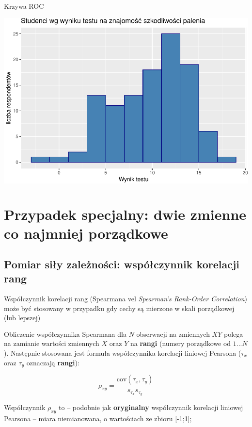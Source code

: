 \documentclass[
  openany]{book}
\begin{document}
\begin{example}
Krzywa ROC

\includegraphics{_main_files/figure-latex/unnamed-chunk-79-1.pdf}
\end{example}

\hypertarget{przypadek-specjalny-dwie-zmienne-co-najmniej-porzux105dkowe}{%
\section{Przypadek specjalny: dwie zmienne co najmniej porządkowe}\label{przypadek-specjalny-dwie-zmienne-co-najmniej-porzux105dkowe}}

\hypertarget{pomiar-siux142y-zaleux17cnoux15bci-wspuxf3ux142czynnik-korelacji-rang}{%
\subsection{Pomiar siły zależności: współczynnik korelacji rang}\label{pomiar-siux142y-zaleux17cnoux15bci-wspuxf3ux142czynnik-korelacji-rang}}

Współczynnik korelacji rang (Spearmana vel \emph{Spearman's Rank-Order Correlation})
może być stosowany
w przypadku gdy cechy są mierzone w skali porządkowej (lub lepszej)

Obliczenie współczynnika Spearmana dla \(N\) obserwacji na zmiennych \(XY\)
polega na zamianie wartości
zmiennych \(X\) oraz \(Y\) na \textbf{rangi} (numery porządkowe od \(1...N\)).
Następnie stosowana jest formuła współczynnika korelacji
liniowej Pearsona (\(\tau_x\) oraz \(\tau_y\) oznaczają \textbf{rangi}):

\[\rho_{xy} = \frac{\textrm{cov}(\tau_x, \tau_y)}{s_{\tau_x}  s_{\tau_y}}\]

Współczynnik \(\rho_{xy}\) to -- podobnie jak \textbf{oryginalny} współczynnik
korelacji liniowej Pearsona -- miara niemianowana, o wartościach
ze zbioru {[}-1;1{]};
\end{document}
